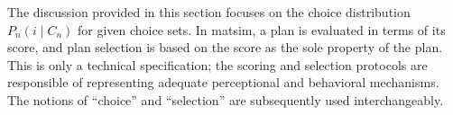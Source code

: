 \begin{oframed}




%
\end{oframed}

The discussion provided in this section focuses on the choice distribution
$P_{n}(i\mid C_{n})$ for given choice sets. In \gls{matsim}, a plan is
evaluated in terms of its score, and plan selection is based on the
score as the sole property of the plan. This is only a technical specification;
the scoring and selection protocols are responsible of representing
adequate perceptional and behavioral mechanisms. The notions of {}``choice''
and {}``selection'' are subsequently used interchangeably. 

